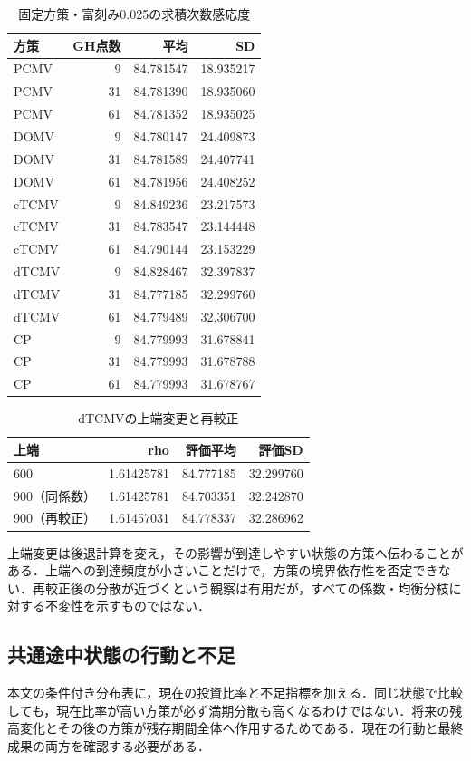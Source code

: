 \documentclass[11pt,a4paper]{article}
\numberwithin{equation}{section}
\numberwithin{table}{section}
\numberwithin{figure}{section}
\theoremstyle{plain}
\theoremstyle{definition}
\begin{document}
\begin{table}[htbp]\centering\small
\caption{固定方策・富刻み0.025の求積次数感応度}\label{tab:gh-full}
\begin{tabular}{lrrr}\toprule
方策 & GH点数 & 平均 & SD \\ \midrule
PCMV & 9 & 84.781547 & 18.935217 \\
PCMV & 31 & 84.781390 & 18.935060 \\
PCMV & 61 & 84.781352 & 18.935025 \\
DOMV & 9 & 84.780147 & 24.409873 \\
DOMV & 31 & 84.781589 & 24.407741 \\
DOMV & 61 & 84.781956 & 24.408252 \\
cTCMV & 9 & 84.849236 & 23.217573 \\
cTCMV & 31 & 84.783547 & 23.144448 \\
cTCMV & 61 & 84.790144 & 23.153229 \\
dTCMV & 9 & 84.828467 & 32.397837 \\
dTCMV & 31 & 84.777185 & 32.299760 \\
dTCMV & 61 & 84.779489 & 32.306700 \\
CP & 9 & 84.779993 & 31.678841 \\
CP & 31 & 84.779993 & 31.678788 \\
CP & 61 & 84.779993 & 31.678767 \\
\bottomrule\end{tabular}\end{table}

\begin{table}[htbp]\centering\small
\caption{dTCMVの上端変更と再較正}\label{tab:cap-full}
\begin{tabular}{lrrr}\toprule
上端 & rho & 評価平均 & 評価SD \\ \midrule
600 & 1.61425781 & 84.777185 & 32.299760 \\
900（同係数） & 1.61425781 & 84.703351 & 32.242870 \\
900（再較正） & 1.61457031 & 84.778337 & 32.286962 \\
\bottomrule\end{tabular}\end{table}

上端変更は後退計算を変え，その影響が到達しやすい状態の方策へ伝わることがある．上端への到達頻度が小さいことだけで，方策の境界依存性を否定できない．再較正後の分散が近づくという観察は有用だが，すべての係数・均衡分枝に対する不変性を示すものではない．

\subsection{共通途中状態の行動と不足}
本文の条件付き分布表に，現在の投資比率と不足指標を加える．同じ状態で比較しても，現在比率が高い方策が必ず満期分散も高くなるわけではない．将来の残高変化とその後の方策が残存期間全体へ作用するためである．現在の行動と最終成果の両方を確認する必要がある．
\end{document}
